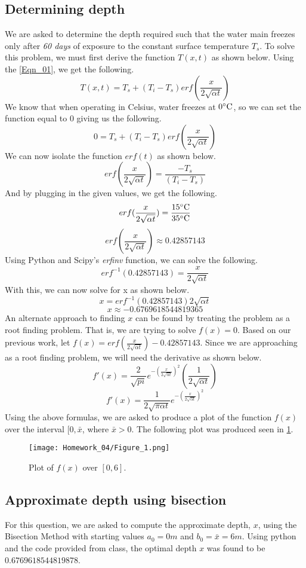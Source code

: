 \documentclass{article}
\begin{document}
\subsection{Determining depth}
We are asked to determine the depth required such that the water main freezes only after \textit{60 days} of exposure to the constant surface temperature \(T_s\). To solve this problem, we must first derive the function \(T(x,t)\) as shown below. Using the \ref{Eqn_01}, we get the following.
\[
T(x,t) = T_s + (T_i-T_s)erf(\frac{x}{2\sqrt{\alpha t}})
\]
We know that when operating in Celsius, water freezes at \(0\degree \mbox{C}\), so we can set the function equal to \(0\) giving us the following.
\[
0 = T_s + (T_i-T_s)erf(\frac{x}{2\sqrt{\alpha t}})
\]
We can now isolate the function \(erf(t)\) as shown below.
\[
erf(\frac{x}{2\sqrt{\alpha t}}) = \frac{-T_s}{(T_i-T_s)}
\]
And by plugging in the given values, we get the following.
\[
erf(\frac{x}{2\sqrt{\alpha t}}) = \frac{15\degree\mbox{C}}{35\degree\mbox{C}}
\]
\[
erf(\frac{x}{2\sqrt{\alpha t}}) \approx 0.42857143
\]
Using Python and Scipy's \textit{erfinv} function, we can solve the following.
\[
erf^{-1}(0.42857143) = \frac{x}{2\sqrt{\alpha t}}
\]
With this, we can now solve for x as shown below.
\[
x = erf^{-1}(0.42857143)2\sqrt{\alpha t}
\]
\[
x\approx-0.6769618544819365
\]
An alternate approach to finding \(x\) can be found by treating the problem as a root finding problem. That is, we are trying to solve \(f(x)=0\). Based on our previous work, let \(f(x)=erf(\frac{x}{2\sqrt{\alpha t}})-0.42857143\). Since we are approaching as a root finding problem, we will need the derivative as shown below.
\[
f'(x) = \frac{2}{\sqrt{pi}} e^{-(\frac{x}{2\sqrt{\alpha t}})^2} (\frac{1}{2\sqrt{\alpha t}})
\]
\[
f'(x) = \frac{1}{2\sqrt{\pi\alpha t}}e^{-(\frac{x}{2\sqrt{\alpha t}})^2}
\]
Using the above formulas, we are asked to produce a plot of the function \(f(x)\) over the interval \([0,\bar{x}\), where \(\bar{x} > 0\). The following plot was produced seen in \ref{fig:Figure_01}.
\begin{figure}[h!]
    \centering
    \texttt{[image: Homework\_04/Figure\_1.png]}
    \caption{Plot of \(f(x)\) over \([0,6].\)}
    \label{fig:Figure_01}
\end{figure}

\subsection{Approximate depth using bisection}
For this question, we are asked to compute the approximate depth, \(x\), using the Bisection Method with starting values \(a_0=0m\) and \(b_0=\bar{x}=6m\). Using python and the code provided from class, the optimal depth \(x\) was found to be \(0.6769618544819878\).
\end{document}
